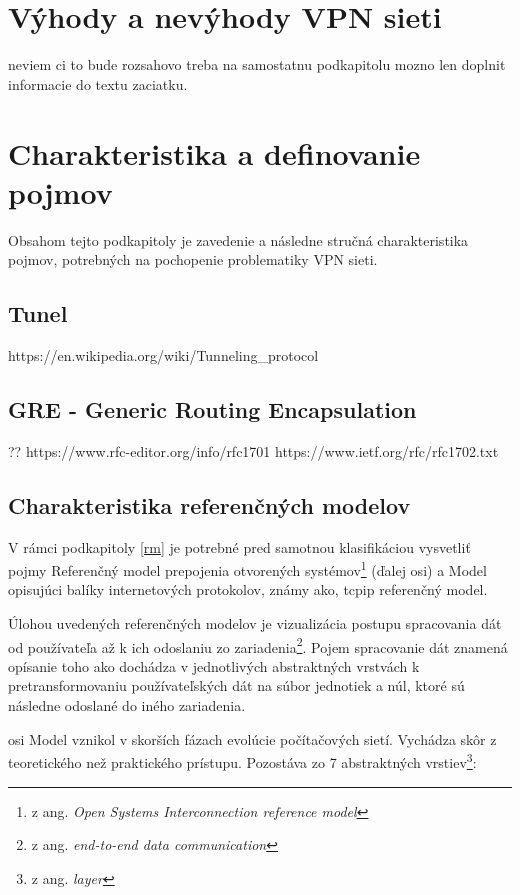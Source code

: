 \section{Výhody a nevýhody VPN sieti}
neviem ci to bude rozsahovo treba na samostatnu podkapitolu
mozno len doplnit informacie do textu zaciatku.

\section{Charakteristika a definovanie pojmov}
Obsahom tejto podkapitoly je zavedenie a následne stručná charakteristika pojmov, potrebných na pochopenie problematiky VPN sieti.
\subsection{Tunel}
https://en.wikipedia.org/wiki/Tunneling\_protocol

\subsection{GRE - Generic Routing Encapsulation}\label{gre}
??
https://www.rfc-editor.org/info/rfc1701
https://www.ietf.org/rfc/rfc1702.txt
\subsection{Charakteristika referenčných modelov}\label{crm}
V rámci  podkapitoly \ref{rm} je potrebné pred samotnou klasifikáciou vysvetliť pojmy Referenčný model prepojenia otvorených systémov\footnote{z ang. \textit{Open Systems Interconnection reference model}} (ďalej \acrshort{osi}) a Model opisujúci balíky internetových protokolov, známy ako, \acrshort{tcpip} referenčný model.

Úlohou uvedených referenčných modelov je vizualizácia postupu spracovania dát od používateľa až k ich odoslaniu zo zariadenia\footnote{z ang. \textit{end-to-end data communication}}. Pojem spracovanie dát znamená opísanie toho ako dochádza v jednotlivých abstraktných vrstvách k pretransformovaniu používateľských dát na súbor jednotiek a núl, ktoré sú následne odoslané do iného zariadenia. 

\acrshort{osi} Model vznikol v skorších fázach evolúcie počítačových sietí. Vychádza skôr z teoretického než praktického prístupu. Pozostáva zo 7 abstraktných vrstiev\footnote{z ang. \textit{layer}}:

